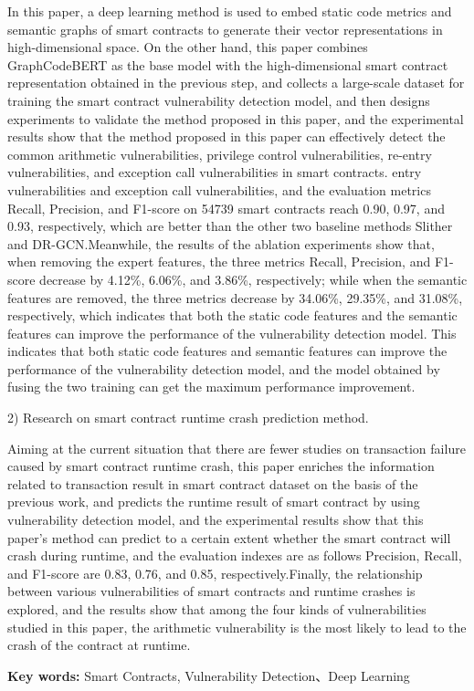     In this paper, a deep learning method is used to embed static code metrics and semantic graphs of smart contracts to generate their vector representations in high-dimensional space. On the other hand, this paper combines GraphCodeBERT as the base model with the high-dimensional smart contract representation obtained in the previous step, and collects a large-scale dataset for training the smart contract vulnerability detection model, and then designs experiments to validate the method proposed in this paper, and the experimental results show that the method proposed in this paper can effectively detect the common arithmetic vulnerabilities, privilege control vulnerabilities, re-entry vulnerabilities, and exception call vulnerabilities in smart contracts. entry vulnerabilities and exception call vulnerabilities, and the evaluation metrics Recall, Precision, and F1-score on \num{54739} smart contracts reach 0.90, 0.97, and 0.93, respectively, which are better than the other two baseline methods Slither and DR-GCN.Meanwhile, the results of the ablation experiments show that, when removing the expert features, the three metrics Recall, Precision, and F1-score decrease by 4.12\%, 6.06\%, and 3.86\%, respectively; while when the semantic features are removed, the three metrics decrease by 34.06\%, 29.35\%, and 31.08\%, respectively, which indicates that both the static code features and the semantic features can improve the performance of the vulnerability detection model. This indicates that both static code features and semantic features can improve the performance of the vulnerability detection model, and the model obtained by fusing the two training can get the maximum performance improvement.
    
    2) Research on smart contract runtime crash prediction method.
    
    Aiming at the current situation that there are fewer studies on transaction failure caused by smart contract runtime crash, this paper enriches the information related to transaction result in smart contract dataset on the basis of the previous work, and predicts the runtime result of smart contract by using vulnerability detection model, and the experimental results show that this paper's method can predict to a certain extent whether the smart contract will crash during runtime, and the evaluation indexes are as follows Precision, Recall, and F1-score are 0.83, 0.76, and 0.85, respectively.Finally, the relationship between various vulnerabilities of smart contracts and runtime crashes is explored, and the results show that among the four kinds of vulnerabilities studied in this paper, the arithmetic vulnerability is the most likely to lead to the crash of the contract at runtime.



    {\noindent \textbf{Key words: } Smart Contracts, Vulnerability Detection、Deep Learning}
